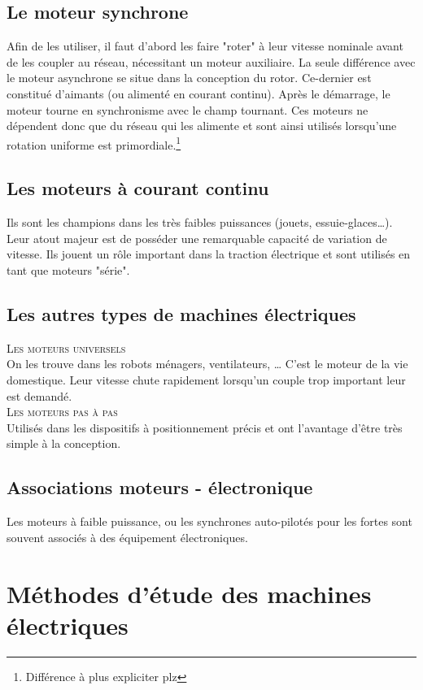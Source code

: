 	\subsection{Le moteur synchrone}
	Afin de les utiliser, il faut d'abord les faire "roter" à leur 
	vitesse nominale avant de les coupler au réseau, nécessitant un 
	moteur auxiliaire. La seule différence avec le moteur asynchrone 
	se situe dans la conception du rotor. Ce-dernier est constitué 
	d'aimants (ou alimenté en courant continu). Après le démarrage, le 
	moteur tourne en synchronisme avec le champ tournant. Ces moteurs 
	ne dépendent donc que du réseau qui les alimente et sont ainsi 
	utilisés lorsqu'une rotation uniforme est primordiale.\footnote{
	Différence à plus expliciter plz}
	
	
	\subsection{Les moteurs à courant continu}
	Ils sont les champions dans les très faibles puissances (jouets, 
	essuie-glaces\dots). Leur atout majeur est de posséder une 
	remarquable capacité de variation de vitesse. Ils jouent un rôle 
	important dans la traction électrique et sont utilisés en tant que 
	moteurs "série".
	
	\subsection{Les autres types de machines électriques}
		\textsc{Les moteurs universels}\\
		On les trouve dans les robots ménagers, ventilateurs, \dots  
		C'est le moteur de la vie domestique. Leur vitesse chute 
		rapidement lorsqu'un couple trop important leur est demandé.\\
		
		\textsc{Les moteurs pas à pas}\\
		Utilisés dans les dispositifs à positionnement précis et ont 
		l'avantage d’être très simple à la conception.
		
	\subsection{Associations moteurs - électronique}
	Les moteurs à faible puissance, ou les synchrones auto-pilotés pour 
	les fortes sont souvent associés à des équipement électroniques.
	
	
\section{Méthodes d'étude des machines électriques}
